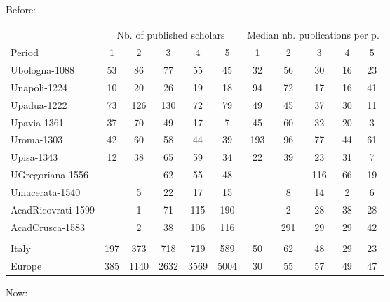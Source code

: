 \documentclass[12pt]{article}
\begin{document}
Before:


		\begin{tabular}{@{ \extracolsep{1pt}}lcccccccccc}
			\hline
			\hline
			& \multicolumn{5}{c}{Nb. of published scholars}  & \multicolumn{5}{c}{ Median nb. publications per p.}\\
			Period   & 1 &2 & 3 & 4 & 5  & 1 &2 & 3 & 4 & 5\\
			\hline
Ubologna-1088        & 53    & 86    & 77    & 55    & 45    & 32    & 56    & 30    & 16    & 23 \\
Unapoli-1224         & 10    & 20    & 26    & 19    & 18    & 94    & 72    & 17    & 16    & 41 \\
Upadua-1222          & 73    & 126   & 130   & 72    & 79    & 49    & 45    & 37    & 30    & 11 \\
Upavia-1361          & 37    & 70    & 49    & 17    & 7     & 45    & 60    & 32    & 20    & 3 \\
Uroma-1303           & 42    & 60    & 58    & 44    & 39    & 193   & 96    & 77    & 44    & 61 \\
Upisa-1343           & 12    & 38    & 65    & 59    & 34    & 22    & 39    & 23    & 31    & 7 \\
UGregoriana-1556     &      &      & 62    & 55    & 48    &      &      & 116   & 66    & 19 \\
Umacerata-1540       &      & 5     & 22    & 17    & 15    &      & 8     & 14    & 2     & 6 \\
AcadRicovrati-1599   &      & 1     & 71    & 115   & 190   &      & 2     & 28    & 38    & 28 \\
AcadCrusca-1583      &      & 2     & 38    & 106   & 116   &      & 291   & 29    & 29    & 42 \\
\\
Italy                & 197   & 373   & 718   & 719   & 589   & 50    & 62    & 48    & 29    & 23 \\
Europe               & 385   & 1140  & 2632  & 3569  & 5004  & 30    & 55    & 57    & 49    & 47 \\
			\hline
			\hline
	\end{tabular}

Now:
\end{document}
